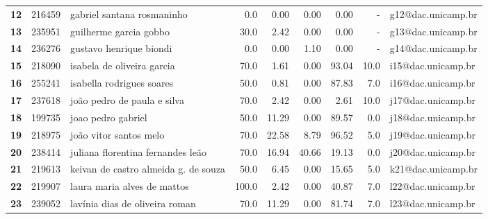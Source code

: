 \documentclass[11pt]{article}
\begin{document}
\begin{center}
\begin{landscape}
\begin{longtable}{lllrrrrrl}
\textbf{12    } &  216459 &            gabriel santana rosmaninho &                   0.0 &        0.00 &        0.00 &        0.00 &                        - &  g12@dac.unicamp.br \\
\textbf{13    } &  235951 &                guilherme garcia gobbo &                  30.0 &        2.42 &        0.00 &        0.00 &                        - &  g13@dac.unicamp.br \\
\textbf{14    } &  236276 &               gustavo henrique biondi &                   0.0 &        0.00 &        1.10 &        0.00 &                        - &  g14@dac.unicamp.br \\
\textbf{15    } &  218090 &            isabela de oliveira garcia &                  70.0 &        1.61 &        0.00 &       93.04 &                     10.0 &  i15@dac.unicamp.br \\
\textbf{16    } &  255241 &             isabella rodrigues soares &                  50.0 &        0.81 &        0.00 &       87.83 &                      7.0 &  i16@dac.unicamp.br \\
\textbf{17    } &  237618 &           joão pedro de paula e silva &                  70.0 &        2.42 &        0.00 &        2.61 &                     10.0 &  j17@dac.unicamp.br \\
\textbf{18    } &  199735 &                    joao pedro gabriel &                  50.0 &       11.29 &        0.00 &       89.57 &                      0.0 &  j18@dac.unicamp.br \\
\textbf{19    } &  218975 &                joão vitor santos melo &                  70.0 &       22.58 &        8.79 &       96.52 &                      5.0 &  j19@dac.unicamp.br \\
\textbf{20    } &  238414 &     juliana florentina fernandes leão &                  70.0 &       16.94 &       40.66 &       19.13 &                      0.0 &  j20@dac.unicamp.br \\
\textbf{21    } &  219613 &  keivan de castro almeida g. de souza &                  50.0 &        6.45 &        0.00 &       15.65 &                      5.0 &  k21@dac.unicamp.br \\
\textbf{22    } &  219907 &           laura maria alves de mattos &                 100.0 &        2.42 &        0.00 &       40.87 &                      7.0 &  l22@dac.unicamp.br \\
\textbf{23    } &  239052 &        lavínia dias de oliveira roman &                  70.0 &       11.29 &        0.00 &       81.74 &                      7.0 &  l23@dac.unicamp.br \\

\end{longtable}
\end{landscape}
\end{center}
\end{document}
